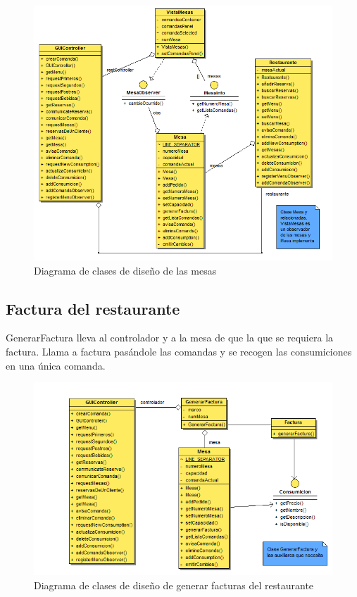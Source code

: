 \documentclass[spanish,a4paper,11pt, twoside]{report}	%
\begin{document}
		\begin{figure}[!h]
		\centering
		\includegraphics[scale=0.5]{DCDmesas.png}
		\caption{Diagrama de clases de diseño de las mesas}
		\end{figure}
\clearpage
		\subsection{Factura del restaurante}
		GenerarFactura lleva al controlador y a la mesa de que la que se requiera la factura. Llama a factura pasándole las comandas y se recogen las consumiciones en una única comanda.
		\begin{figure}[!h]
		\centering
		\includegraphics[scale=0.5]{DCDfactura.png}
		\caption{Diagrama de clases de diseño de generar facturas del restaurante}
		\end{figure}
\end{document}

